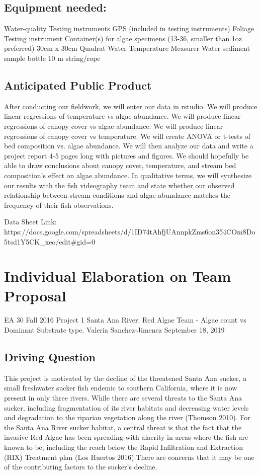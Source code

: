 \documentclass{article}\usepackage[]{graphicx}\usepackage[]{color}
\begin{document}
\subsection{Equipment needed:}
	Water-quality Testing instruments 
	GPS (included in testing instruments)
	Foliage Testing instrument 
	Container(s) for algae specimens (13-36, smaller than 1oz preferred)
	30cm x 30cm Quadrat
	Water Temperature Measurer
	Water sediment sample bottle
	10 m string/rope 

\subsection{Anticipated Public Product}
	After conducting our fieldwork, we will enter our data in rstudio. 
We will produce linear regressions of temperature vs algae abundance. 
We will produce linear regressions of canopy cover vs algae abundance.
We will produce linear regressions of canopy cover vs temperature.
We will create ANOVA or t-tests of bed composition vs. algae abundance. 
	We will then analyze our data and write a project report 4-5 pages long with pictures and figures. We should hopefully be able to draw conclusions about canopy cover, temperature, and stream bed composition’s effect on algae abundance. In qualitative terms, we will synthesize our results with the fish videography team and state whether our observed relationship between stream conditions and algae abundance matches the frequency of their fish observations. 

Data Sheet Link: https://docs.google.com/spreadsheets/d/1ID74tAhfjUAnnpkZms6on354COm8Do5tsd1Y5CK_xeo/edit#gid=0


\section{Individual Elaboration on Team Proposal}

EA 30 Fall 2016 Project 1
Santa Ana River: Red Algae Team - Algae count vs Dominant Substrate type.
Valeria Sanchez-Jimenez
September 18, 2019

\subsection{Driving Question}

This project is motivated by the decline of the threatened Santa Ana sucker, a small freshwater sucker fish endemic to southern California, where it is now present in only three rivers. While there are several threats to the Santa Ana sucker, including fragmentation of its river habitats and decreasing water levels and degradation to the riparian vegetation along the river (Thomson 2010). For the Santa Ana River sucker habitat, a central threat is that the fact that the invasive Red Algae has been spreading with alacrity in areas where the fish are known to be, including the reach below the Rapid Infiltration and Extraction (RIX) Treatment plan (Los Huertos 2016).There are concerns that it may be one of the contributing factors to the sucker’s decline.
\end{document}
